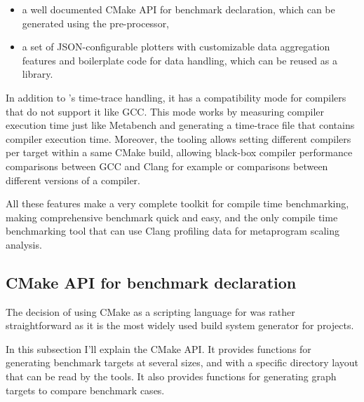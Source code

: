 \documentclass[../../main.tex]{subfiles}
\begin{document}
\begin{itemize}
\item a well documented CMake API for benchmark declaration, which can be
      generated using the \cpp pre-processor,
\item a set of JSON-configurable plotters with customizable data aggregation
      features and boilerplate code for data handling, which can be reused as a
      \cpp library.
\end{itemize}

In addition to \ctbench's time-trace handling, it has a compatibility mode
for compilers that do not support it like GCC. This mode works by measuring
compiler execution time just like Metabench\cite{metabench} and generating a
time-trace file that contains compiler execution time. Moreover, the tooling
allows setting different compilers per target within a same CMake build,
allowing black-box compiler performance comparisons between GCC and Clang for
example or comparisons between different versions of a compiler.

All these features make \ctbench a very complete toolkit for compile time
benchmarking, making comprehensive benchmark quick and easy, and the only
compile time benchmarking tool that can use Clang profiling data for metaprogram
scaling analysis.

\subsection{CMake API for benchmark declaration}
\label{lbl:ctbench-cmake-api}

The decision of using CMake as a scripting language for \ctbench was rather
straightforward as it is the most widely used build system generator for \cpp
projects.

In this subsection I'll explain the CMake API. It provides functions for
generating benchmark targets at several sizes, and with a specific directory
layout that can be read by the \grapher tools. It also provides functions for
generating graph targets to compare benchmark cases.
\end{document}

